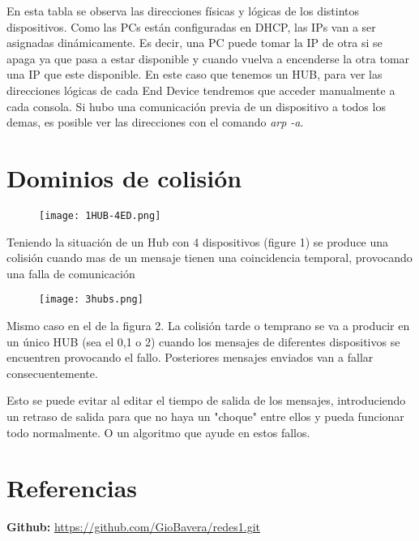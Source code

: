 \documentclass{article}
\begin{document}
En esta tabla se observa las direcciones físicas y lógicas de los distintos dispositivos. Como las PCs están configuradas en DHCP, las IPs van a ser asignadas dinámicamente. Es decir, una PC puede tomar la IP de otra si se apaga ya que pasa a estar disponible y cuando vuelva a encenderse la otra tomar una IP que este disponible. 
En este caso que tenemos un HUB, para ver las direcciones lógicas de cada End Device tendremos que acceder manualmente a cada consola. Si hubo una comunicación previa de un dispositivo a todos los demas, es posible ver las direcciones con el comando \textit{arp -a}. 

\section{Dominios de colisión}

\begin{figure}[H]
    \centering
    \texttt{[image: 1HUB-4ED.png]}
    \caption{}
    \label{fig:enter-label}
\end{figure}

Teniendo la situación de un Hub con 4 dispositivos (figure 1) se produce una colisión cuando mas de un mensaje tienen una coincidencia temporal, provocando una falla de comunicación

\begin{figure}[H]
    \centering
    \texttt{[image: 3hubs.png]}
    \caption{}
    \label{fig:enter-label}
\end{figure}           

Mismo caso en el de la figura 2. La colisión tarde o temprano se va a producir en un único HUB (sea el 0,1 o 2) cuando los mensajes de diferentes dispositivos se encuentren provocando el fallo. Posteriores mensajes enviados van a fallar consecuentemente. 

Esto se puede evitar al editar el tiempo de salida de los mensajes, introduciendo un retraso de salida para que no haya un "choque" entre ellos y pueda funcionar todo normalmente. O un algoritmo que ayude en estos fallos. 


\section{Referencias}

\textbf{Github:} \url{https://github.com/GioBavera/redes1.git}
\end{document}
